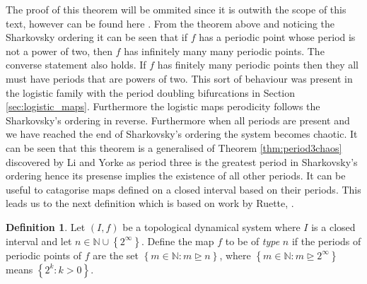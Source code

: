 \documentclass[11pt,a4paper,oneside]{memoir}
\theoremstyle{plain}
\theoremstyle{definition}
\newtheorem{defn}[thm]{Definition}
\begin{document}
The proof of this theorem will be ommited since it is outwith the scope of this text, however can be found here \cite{sharkovsky}. From the theorem above and noticing the Sharkovsky ordering it can be seen that if $f$ has a periodic point whose period is not a power of two, then $f$ has infinitely many many periodic points. The converse statement also holds. If $f$ has finitely many periodic points then they all must have periods that are powers of two. This sort of behaviour was present in the logistic family with the period doubling bifurcations in Section \ref{sec:logistic_maps}. Furthermore the logistic maps perodicity follows the Sharkovsky's ordering in reverse. Furthermore when all periods are present and we have reached the end of Sharkovsky's ordering the system becomes chaotic. It can be seen that this theorem is a generalised of Theorem \ref{thm:period3chaos} discovered by Li and Yorke \cite{li-yorke} as period three is the greatest period in Sharkovsky's ordering hence its presense implies the existence of all other periods. It can be useful to catagorise maps defined on a closed interval based on their periods. This leads us to the next definition which is based on work by Ruette, \cite[Section 3.3]{ruette}.

\begin{defn} \label{def:type}
    Let $(I, f)$ be a topological dynamical system where $I$ is a closed interval and let $n \in \mathbb{N} \cup \left\lbrace 2^{\infty} \right\rbrace$. Define the map $f$ to be of \emph{type} $n$ if the periods of periodic points of $f$ are the set $\left\lbrace m \in \mathbb{N} : m \unrhd n \right\rbrace$, where $\left\lbrace m \in \mathbb{N} : m \unrhd 2^\infty \right\rbrace$ means $\left\lbrace 2^k : k > 0 \right\rbrace$.
\end{defn}
\end{document}
